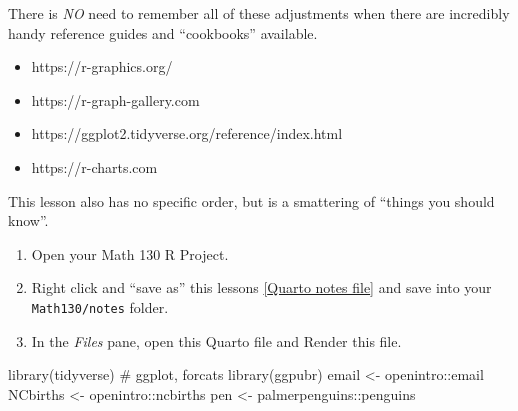\documentclass[
  letterpaper,
  DIV=11,
  numbers=noendperiod,
  oneside]{scrreprt}
\newenvironment{Shaded}{\begin{snugshade}}{\end{snugshade}}
\newcommand{\CommentTok}[1]{\textcolor[rgb]{0.37,0.37,0.37}{#1}}
\newcommand{\FunctionTok}[1]{\textcolor[rgb]{0.28,0.35,0.67}{#1}}
\newcommand{\NormalTok}[1]{\textcolor[rgb]{0.00,0.23,0.31}{#1}}
\newcommand{\OtherTok}[1]{\textcolor[rgb]{0.00,0.23,0.31}{#1}}
\newcommand{\SpecialCharTok}[1]{\textcolor[rgb]{0.37,0.37,0.37}{#1}}
\providecommand{\tightlist}{%
  \setlength{\itemsep}{0pt}\setlength{\parskip}{0pt}}\usepackage{longtable,booktabs,array}
\begin{document}
\begin{tcolorbox}[enhanced jigsaw, bottomrule=.15mm, colback=white, colframe=quarto-callout-important-color-frame, toprule=.15mm, coltitle=black, rightrule=.15mm, opacitybacktitle=0.6, colbacktitle=quarto-callout-important-color!10!white, toptitle=1mm, leftrule=.75mm, breakable, bottomtitle=1mm, titlerule=0mm, title=\textcolor{quarto-callout-important-color}{\faExclamation}\hspace{0.5em}{Too much to memorize!}, arc=.35mm, left=2mm, opacityback=0]

There is \emph{NO} need to remember all of these adjustments when there
are incredibly handy reference guides and ``cookbooks'' available.

\begin{itemize}
\tightlist
\item
  https://r-graphics.org/
\item
  https://r-graph-gallery.com
\item
  https://ggplot2.tidyverse.org/reference/index.html
\item
  https://r-charts.com
\end{itemize}

This lesson also has no specific order, but is a smattering of ``things
you should know''.

\end{tcolorbox}

\begin{tcolorbox}[enhanced jigsaw, bottomrule=.15mm, colback=white, colframe=quarto-callout-tip-color-frame, toprule=.15mm, coltitle=black, rightrule=.15mm, opacitybacktitle=0.6, colbacktitle=quarto-callout-tip-color!10!white, toptitle=1mm, leftrule=.75mm, breakable, bottomtitle=1mm, titlerule=0mm, title={👉 Prepare}, arc=.35mm, left=2mm, opacityback=0]

\begin{enumerate}
\def\labelenumi{\arabic{enumi}.}
\tightlist
\item
  Open your Math 130 R Project.
\item
  Right click and ``save as'' this lessons
  \href{notes/plots2_notes.qmd}{{[}Quarto notes file{]}} and save into
  your \texttt{Math130/notes} folder.
\item
  In the \emph{Files} pane, open this Quarto file and Render this file.
\end{enumerate}

\begin{Shaded}
\begin{Highlighting}[]
\FunctionTok{library}\NormalTok{(tidyverse) }\CommentTok{\# ggplot, forcats}
\FunctionTok{library}\NormalTok{(ggpubr)}
\NormalTok{email }\OtherTok{\textless{}{-}}\NormalTok{ openintro}\SpecialCharTok{::}\NormalTok{email}
\NormalTok{NCbirths }\OtherTok{\textless{}{-}}\NormalTok{ openintro}\SpecialCharTok{::}\NormalTok{ncbirths}
\NormalTok{pen }\OtherTok{\textless{}{-}}\NormalTok{ palmerpenguins}\SpecialCharTok{::}\NormalTok{penguins}
\end{Highlighting}
\end{Shaded}

\end{tcolorbox}
\end{document}
